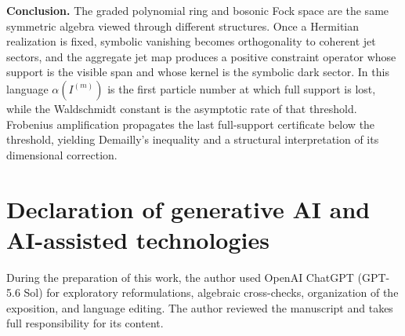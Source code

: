 \documentclass[11pt]{article}
\theoremstyle{remark}
\begin{document}
\medskip
\noindent\textbf{Conclusion.}
The graded polynomial ring and bosonic Fock space are the same symmetric algebra viewed through different structures.  Once a Hermitian realization is fixed, symbolic vanishing becomes orthogonality to coherent jet sectors, and the aggregate jet map produces a positive constraint operator whose support is the visible span and whose kernel is the symbolic dark sector.  In this language $\alpha(I^{(m)})$ is the first particle number at which full support is lost, while the Waldschmidt constant is the asymptotic rate of that threshold.  Frobenius amplification propagates the last full-support certificate below the threshold, yielding Demailly's inequality and a structural interpretation of its dimensional correction.

\section*{Declaration of generative AI and AI-assisted technologies}
During the preparation of this work, the author used OpenAI ChatGPT (GPT-5.6 Sol) for exploratory reformulations, algebraic cross-checks, organization of the exposition, and language editing.  The author reviewed the manuscript and takes full responsibility for its content.
\end{document}
